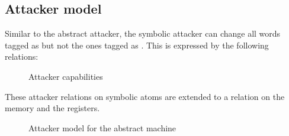 \subsection{Attacker model}\label{sec:symbolic_attacker}

Similar to the abstract attacker, the symbolic attacker can change all words
tagged as \DATAname but not the ones tagged as \INSTRname. This is expressed by
the following relations:


\begin{figure}[ht]
\centering
\begin{minipage}[b]{0.25\linewidth}
\centering
{}
\label{fig:Attack_{data}}
\end{minipage}
\hspace{0.5cm}
\begin{minipage}[b]{0.15\linewidth}
\centering
{}
\label{fig:Attack_{instr}}
\end{minipage}
\caption{Attacker capabilities}
\end{figure}

These attacker relations on symbolic atoms are extended to a relation on the
memory and the registers.

\begin{figure}[!htpb]
\caption{Attacker model for the abstract machine}
\end{figure}
